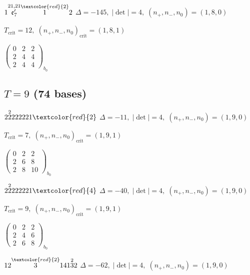\documentclass[10pt]{article}
\begin{document}
\smallskip

$1\overset{21,21}{\mathfrak{e}_7'}\overset{\textcolor{red}{2}}{1}2$ \quad $\Delta=-145,\; |\det|=4,\; (n_+,n_-,n_0)=(1,8,0)$

\hspace{1em}$T_{\text{crit}}=12,\; (n_+,n_-,n_0)_{\text{crit}}=(1,8,1)$

\hspace{2em}$\left(\begin{smallmatrix}0 & 2 & 2 \\ 2 & 4 & 4 \\ 2 & 4 & 4\end{smallmatrix}\right)_{\!b_0}$


\subsection*{$T = 9$ \quad (74 bases)}
\smallskip

$2\overset{2}{2}222221\textcolor{red}{2}$ \quad $\Delta=-11,\; |\det|=4,\; (n_+,n_-,n_0)=(1,9,0)$

\hspace{1em}$T_{\text{crit}}=7,\; (n_+,n_-,n_0)_{\text{crit}}=(1,9,1)$

\hspace{2em}$\left(\begin{smallmatrix}0 & 2 & 2 \\ 2 & 6 & 8 \\ 2 & 8 & 10\end{smallmatrix}\right)_{\!b_0}$

$2\overset{2}{2}222221\textcolor{red}{4}$ \quad $\Delta=-40,\; |\det|=4,\; (n_+,n_-,n_0)=(1,9,0)$

\hspace{1em}$T_{\text{crit}}=9,\; (n_+,n_-,n_0)_{\text{crit}}=(1,9,1)$

\hspace{2em}$\left(\begin{smallmatrix}0 & 2 & 2 \\ 2 & 4 & 6 \\ 2 & 6 & 8\end{smallmatrix}\right)_{\!b_0}$

\smallskip

$12\overset{\textcolor{red}{2}}{3}141\overset{2}{3}2$ \quad $\Delta=-62,\; |\det|=4,\; (n_+,n_-,n_0)=(1,9,0)$
\end{document}
